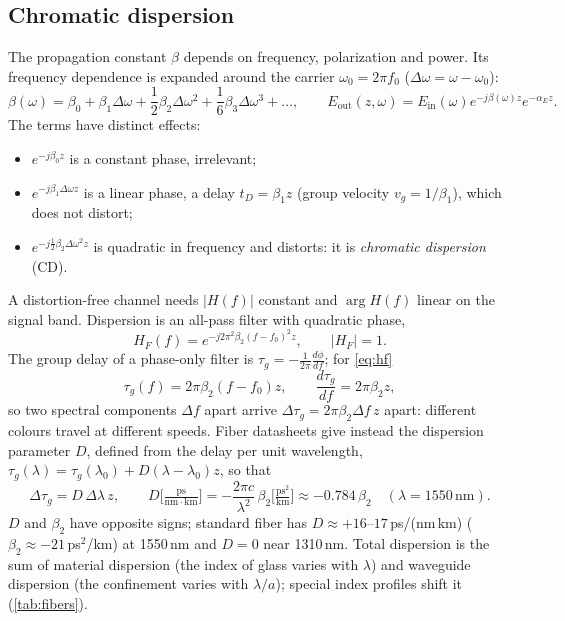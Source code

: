 \subsection{Chromatic dispersion}\label{sec:cd}
The propagation constant $\beta$ depends on frequency, polarization and power. Its frequency
dependence is expanded around the carrier $\omega_0=2\pi f_0$ ($\Delta\omega=\omega-\omega_0$):
\begin{equation}
  \beta(\omega)=\beta_0+\beta_1\Delta\omega+\frac12\beta_2\Delta\omega^2+\frac16\beta_3\Delta\omega^3+\dots,
  \qquad E_{\mathrm{out}}(z,\omega)=E_{\mathrm{in}}(\omega)e^{-j\beta(\omega)z}e^{-\alpha_Ez}.
\end{equation}
The terms have distinct effects:
\begin{itemize}
  \item $e^{-j\beta_0z}$ is a constant phase, irrelevant;
  \item $e^{-j\beta_1\Delta\omega z}$ is a linear phase, a delay $t_D=\beta_1z$ (group velocity $v_g=1/\beta_1$),
  which does not distort;
  \item $e^{-j\frac12\beta_2\Delta\omega^2z}$ is quadratic in frequency and distorts: it is
  \emph{chromatic dispersion} (CD).
\end{itemize}
A distortion-free channel needs $|H(f)|$ constant and $\arg H(f)$ linear on the signal band.
Dispersion is an all-pass filter with quadratic phase,
\begin{equation}
  H_F(f)=e^{-j2\pi^2\beta_2(f-f_0)^2z},\qquad |H_F|=1 .
  \label{eq:hf}
\end{equation}
The group delay of a phase-only filter is $\tau_g=-\frac{1}{2\pi}\frac{d\phi}{df}$; for
\cref{eq:hf}
\begin{equation}
  \tau_g(f)=2\pi\beta_2(f-f_0)z,\qquad \frac{d\tau_g}{df}=2\pi\beta_2z,
\end{equation}
so two spectral components $\Delta f$ apart arrive $\Delta\tau_g=2\pi\beta_2\Delta f\,z$ apart:
different colours travel at different speeds. Fiber datasheets give instead the dispersion
parameter $D$, defined from the delay per unit wavelength,
$\tau_g(\lambda)=\tau_g(\lambda_0)+D(\lambda-\lambda_0)z$, so that
\begin{equation}
  \Delta\tau_g=D\,\Delta\lambda\,z,\qquad
  D\Big[\tfrac{\mathrm{ps}}{\mathrm{nm\cdot km}}\Big]=-\frac{2\pi c}{\lambda^2}\,\beta_2\Big[\tfrac{\mathrm{ps}^2}{\mathrm{km}}\Big]
  \approx-0.784\,\beta_2\quad(\lambda=1550\,\mathrm{nm}).
\end{equation}
$D$ and $\beta_2$ have opposite signs; standard fiber has $D\approx+16$--$17$\,ps/(nm\,km)
($\beta_2\approx-21$\,ps$^2$/km) at 1550\,nm and $D=0$ near 1310\,nm. Total dispersion is the sum of
material dispersion (the index of glass varies with $\lambda$) and waveguide dispersion (the
confinement varies with $\lambda/a$); special index profiles shift it (\cref{tab:fibers}).

